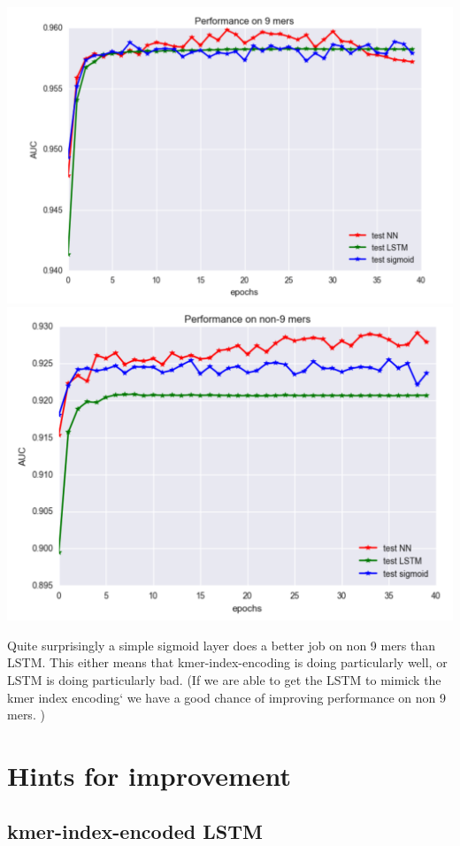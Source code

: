 \documentclass{article} %
\begin{document}
\includegraphics[scale = 0.3]{LSTM_vs_FFN_vs_sigmoid_9mers.png}
\includegraphics[scale = 0.3]{LSTM_vs_FFN_vs_sigmoid_non9mers.png}

Quite surprisingly a simple sigmoid layer does a better job on non 9 mers than LSTM. This either means that kmer-index-encoding is doing particularly well, or LSTM is doing particularly bad. (If we are able to get the LSTM to mimick the kmer index encoding` we have a good chance of improving performance on non 9 mers. )

\section{Hints for improvement}

\subsection{kmer-index-encoded LSTM}
\end{document}
